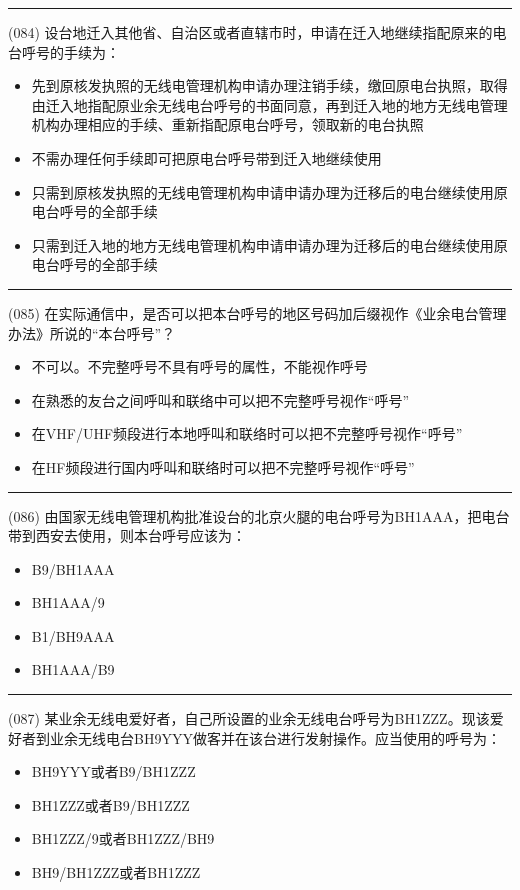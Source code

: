 \documentclass[twocolumn]{ctexart}  %
\begin{document}
\noindent\rule{0.5\textwidth}{1pt}
\heiti (084) 设台地迁入其他省、自治区或者直辖市时，申请在迁入地继续指配原来的电台呼号的手续为： \songti {\color{gray} [LK0092] }
\begin{itemize}
	\item  先到原核发执照的无线电管理机构申请办理注销手续，缴回原电台执照，取得由迁入地指配原业余无线电台呼号的书面同意，再到迁入地的地方无线电管理机构办理相应的手续、重新指配原电台呼号，领取新的电台执照
	\item  不需办理任何手续即可把原电台呼号带到迁入地继续使用
	\item  只需到原核发执照的无线电管理机构申请申请办理为迁移后的电台继续使用原电台呼号的全部手续
	\item  只需到迁入地的地方无线电管理机构申请申请办理为迁移后的电台继续使用原电台呼号的全部手续
\end{itemize}


\noindent\rule{0.5\textwidth}{1pt}
\heiti (085) 在实际通信中，是否可以把本台呼号的地区号码加后缀视作《业余电台管理办法》所说的“本台呼号”？ \songti {\color{gray} [LK1072] }
\begin{itemize}
	\item  不可以。不完整呼号不具有呼号的属性，不能视作呼号
	\item  在熟悉的友台之间呼叫和联络中可以把不完整呼号视作“呼号”
	\item  在VHF/UHF频段进行本地呼叫和联络时可以把不完整呼号视作“呼号”
	\item  在HF频段进行国内呼叫和联络时可以把不完整呼号视作“呼号”
\end{itemize}


\noindent\rule{0.5\textwidth}{1pt}
\heiti (086) 由国家无线电管理机构批准设台的北京火腿的电台呼号为BH1AAA，把电台带到西安去使用，则本台呼号应该为： \songti {\color{gray} [LK0079] }
\begin{itemize}
	\item  B9/BH1AAA
	\item  BH1AAA/9
	\item  B1/BH9AAA
	\item  BH1AAA/B9
\end{itemize}


\noindent\rule{0.5\textwidth}{1pt}
\heiti (087) 某业余无线电爱好者，自己所设置的业余无线电台呼号为BH1ZZZ。现该爱好者到业余无线电台BH9YYY做客并在该台进行发射操作。应当使用的呼号为： \songti {\color{gray} [LK0084] }
\begin{itemize}
	\item  BH9YYY或者B9/BH1ZZZ
	\item  BH1ZZZ或者B9/BH1ZZZ
	\item  BH1ZZZ/9或者BH1ZZZ/BH9
	\item  BH9/BH1ZZZ或者BH1ZZZ
\end{itemize}
\end{document}
